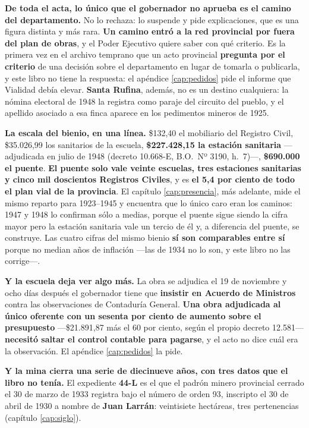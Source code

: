 \begin{cautela}
\textbf{De toda el acta, lo único que el gobernador no aprueba es el camino del
departamento.} No lo rechaza: lo suspende y pide explicaciones, que es una figura distinta y
más rara. \textbf{Un camino entró a la red provincial por fuera del plan de obras}, y el
Poder Ejecutivo quiere saber con qué criterio. Es la primera vez en el archivo temprano que
un acto provincial \textbf{pregunta por el criterio} de una decisión sobre el departamento en
lugar de tomarla o publicarla, y este libro no tiene la respuesta: el apéndice
\ref{cap:pedidos} pide el informe que Vialidad debía elevar. \textbf{Santa Rufina}, además,
no es un destino cualquiera: la nómina electoral de 1948 la registra como paraje del circuito
del pueblo, y el apellido asociado a esa finca aparece en los pedimentos mineros de 1925.

\textbf{La escala del bienio, en una línea.} \$132,40 el mobiliario del Registro Civil,
\$35.026,99 los sanitarios de la escuela, \textbf{\$227.428,15 la estación sanitaria} ---adjudicada en
julio de 1948 (decreto 10.668-E, B.O.\ Nº 3190, h.\ 7)---, \textbf{\$690.000 el puente}. \textbf{El
puente solo vale veinte escuelas, tres estaciones sanitarias y cinco mil doscientos Registros
Civiles}, y es \textbf{el 5,4 por ciento de todo el plan vial de la provincia}. El capítulo
\ref{cap:presencia}, más adelante, mide el mismo reparto para 1923--1945 y encuentra que lo único caro eran los
caminos: 1947 y 1948 lo confirman sólo a medias, porque el puente sigue siendo la cifra mayor pero
la estación sanitaria vale un tercio de él y, a diferencia del puente, se construye. Las cuatro
cifras del mismo bienio \textbf{sí son comparables
entre sí} porque no median años de inflación ---las de 1934 no lo son, y este libro no las
corrige---.

\textbf{Y la escuela deja ver algo más.} La obra se adjudica el 19 de noviembre y ocho días
después el gobernador tiene que \textbf{insistir en Acuerdo de Ministros} contra las
observaciones de Contaduría General. \textbf{Una obra adjudicada al único oferente con un sesenta
por ciento de aumento sobre el presupuesto} ---\$21.891,87 más el 60 por ciento, según el propio
decreto 12.581--- \textbf{necesitó saltar el control contable para pagarse}, y el acto no dice cuál
era la observación. El apéndice
\ref{cap:pedidos} la pide.

\textbf{Y la mina cierra una serie de diecinueve años, con tres datos que el libro no
tenía.} El expediente \textbf{44-L} es el que el padrón minero provincial cerrado el 30 de
marzo de 1933 registra bajo el número de orden 93, inscripto el 30 de abril de 1930 a nombre
de \textbf{Juan Larrán}: veintisiete hectáreas, tres pertenencias (capítulo
\ref{cap:siglo}).


\end{cautela}
